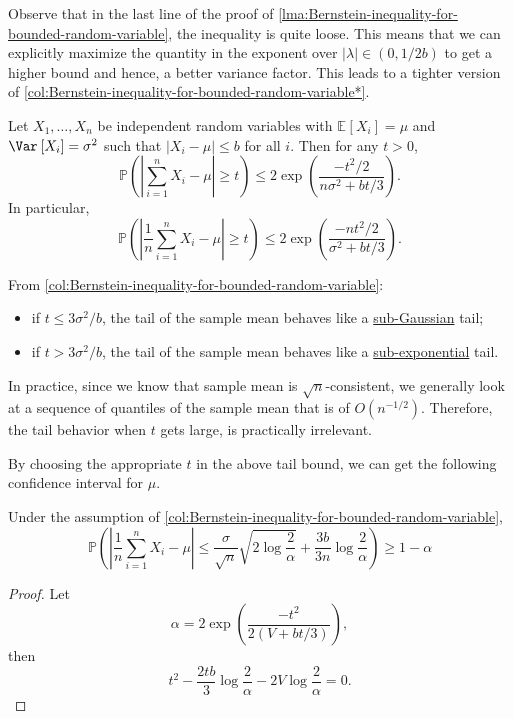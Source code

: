\begin{remark}
	Observe that in the last line of the proof of \autoref{lma:Bernstein-inequality-for-bounded-random-variable}, the inequality is quite loose. This means that we can explicitly maximize the quantity in the exponent over \(\vert \lambda \vert \in (0 , 1 / 2b)\) to get a higher bound and hence, a better variance factor. This leads to a tighter version of \autoref{col:Bernstein-inequality-for-bounded-random-variable*}.
\end{remark}

\begin{corollary}\label{col:Bernstein-inequality-for-bounded-random-variable}
	Let \(X_1, \dots , X_n\) be independent random variables with \(\mathbb{E}_{}\left[X_i \right] = \mu \) and \(\Var_{}\left[X_i \right] = \sigma ^{2}\) such that \(\vert X_i - \mu \vert \leq b\) for all \(i\). Then for any \(t > 0\),
	\[
		\mathbb{P} \left( \left\vert \sum_{i=1}^{n} X_i - \mu \right\vert \geq t \right) \leq 2 \exp \left( \frac{- t^2 / 2}{n \sigma ^{2} + bt / 3 } \right) .
	\]
	In particular,
	\[
		\mathbb{P} \left( \left\vert \frac{1}{n}\sum_{i=1}^{n} X_i - \mu \right\vert \geq t \right) \leq 2 \exp \left( \frac{- nt^2 / 2}{\sigma ^{2} + bt / 3} \right).
	\]
\end{corollary}

From \autoref{col:Bernstein-inequality-for-bounded-random-variable}:
\begin{itemize}
	\item if \(t \leq 3 \sigma ^{2} / b\), the tail of the sample mean behaves like a \hyperref[def:sub-Gaussian]{sub-Gaussian} tail;
	\item if \(t > 3\sigma ^{2} / b\), the tail of the sample mean behaves like a \hyperref[def:sub-exponential]{sub-exponential} tail.
\end{itemize}

\begin{remark}
	In practice, since we know that sample mean is \(\sqrt{n} \)-consistent, we generally look at a sequence of quantiles of the sample mean that is of \(O(n^{-1 / 2})\). Therefore, the tail behavior when \(t\) gets large, is practically irrelevant.
\end{remark}

By choosing the appropriate \(t\) in the above tail bound, we can get the following confidence interval for \(\mu \).

\begin{corollary}\label{col:Bernstein-confidence-interval}
	Under the assumption of \autoref{col:Bernstein-inequality-for-bounded-random-variable},
	\[
		\mathbb{P} \left( \left\vert \frac{1}{n} \sum_{i=1}^{n} X_i - \mu  \right\vert \leq \frac{\sigma}{\sqrt{n} } \sqrt{2 \log \frac{2}{\alpha }} + \frac{3b}{3n} \log \frac{2}{\alpha } \right) \geq 1 - \alpha
	\]
\end{corollary}
\begin{proof}
	Let
	\[
		\alpha = 2 \exp \left( \frac{- t^2}{2(V + bt / 3)} \right),
	\]
	then
	\[
		t^2 - \frac{2tb}{3}\log \frac{2}{\alpha } - 2 V \log \frac{2}{\alpha } = 0.
	\]
\end{proof}

